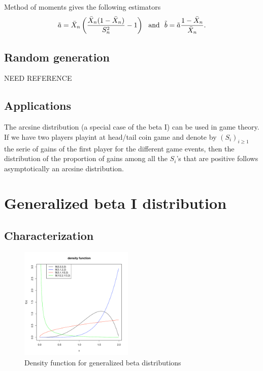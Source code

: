 Method of moments gives the following estimators
$$
\tilde a = \bar X_n \left(\frac{\bar X_n (1 - \bar X_n)}{S_n^2} - 1 \right)
\textrm{~~and~~}
\tilde b = \tilde a \frac{1-\bar X_n}{\bar X_n}.
$$

\subsection{Random generation}
NEED REFERENCE

\subsection{Applications}
The arcsine distribution (a special case of the beta I) can be used in game theory. If we have two players playint at head/tail coin game and denote by $(S_i)_{i\geq 1}$ the serie of gains of the first player for the different game events, then the distribution of the proportion of gains among all the $S_i$'s that are positive follows asymptotically an arcsine distribution.

\section{Generalized beta I distribution}
\subsection{Characterization}
\begin{figure}
  \vspace{-20pt}
  \begin{center}
    \includegraphics[width=0.48\textwidth]{img/genbetazoom}
  \end{center}
  \vspace{-20pt}  
  \caption{Density function for generalized beta distributions}
    \vspace{-20pt}  
\end{figure}

